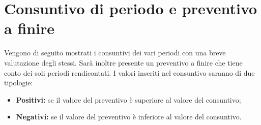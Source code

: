 \section{Consuntivo di periodo e preventivo a finire}
\label{consuntivo_preventivo_a_finire}
Vengono di seguito mostrati i consuntivi dei vari periodi con una breve valutazione degli stessi. Sarà inoltre presente un preventivo a finire che tiene conto dei soli periodi rendicontati. I valori inseriti nel consuntivo saranno di due tipologie:
\begin{itemize}
	\item \textbf{Positivi:} se il valore del preventivo è superiore al valore del consuntivo;
	\item \textbf{Negativi:} se il valore del preventivo è inferiore al valore del consuntivo.
\end{itemize}





